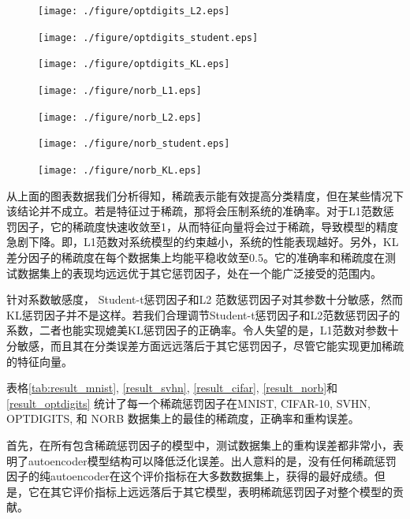 \documentclass[oneside]{ZJUthesis}
\begin{document}
\begin{figure}[h]
\hfill
\begin{minipage}[h]{0.24\linewidth}
\centering
\texttt{[image: ./figure/optdigits\_L2.eps]}
\end{minipage}
\hfill
\begin{minipage}[h]{0.24\linewidth}
\centering
\texttt{[image: ./figure/optdigits\_student.eps]}
\end{minipage}
\hfill
\begin{minipage}[h]{0.24\linewidth}
\centering
\texttt{[image: ./figure/optdigits\_KL.eps]}
\end{minipage}
\hfill
\begin{minipage}[h]{0.24\linewidth}
\centering
\texttt{[image: ./figure/norb\_L1.eps]}
\end{minipage}
\hfill
\begin{minipage}[h]{0.24\linewidth}
\centering
\texttt{[image: ./figure/norb\_L2.eps]}
\end{minipage}
\hfill
\begin{minipage}[h]{0.24\linewidth}
\centering
\texttt{[image: ./figure/norb\_student.eps]}
\end{minipage}	
\hfill
\begin{minipage}[h]{0.24\linewidth}
\centering
\texttt{[image: ./figure/norb\_KL.eps]}
\end{minipage}		
\end{figure}

从上面的图表数据我们分析得知，稀疏表示能有效提高分类精度，但在某些情况下该结论并不成立。若是特征过于稀疏，那将会压制系统的准确率。对于L1范数惩罚因子，它的稀疏度快速收敛至1，从而特征向量将会过于稀疏，导致模型的精度急剧下降。即，L1范数对系统模型的约束越小，系统的性能表现越好。另外，KL差分因子的稀疏度在每个数据集上均能平稳收敛至0.5。它的准确率和稀疏度在测试数据集上的表现均远远优于其它惩罚因子，处在一个能广泛接受的范围内。


针对系数敏感度， Student-t惩罚因子和L2 范数惩罚因子对其参数十分敏感，然而KL惩罚因子并不是这样。若我们合理调节Student-t惩罚因子和L2范数惩罚因子的系数，二者也能实现媲美KL惩罚因子的正确率。令人失望的是，L1范数对参数十分敏感，而且其在分类误差方面远远落后于其它惩罚因子，尽管它能实现更加稀疏的特征向量。

表格\ref{tab:result_mnist}, \ref{result_svhn}, \ref{result_cifar}, \ref{result_norb}和 \ref{result_optdigits} 统计了每一个稀疏惩罚因子在MNIST, CIFAR-10, SVHN, OPTDIGITS, 和 NORB 数据集上的最佳的稀疏度，正确率和重构误差。

首先，在所有包含稀疏惩罚因子的模型中，测试数据集上的重构误差都非常小，表明了autoencoder模型结构可以降低泛化误差。出人意料的是，没有任何稀疏惩罚因子的纯autoencoder在这个评价指标在大多数数据集上，获得的最好成绩。但是，它在其它评价指标上远远落后于其它模型，表明稀疏惩罚因子对整个模型的贡献。
\end{document}
